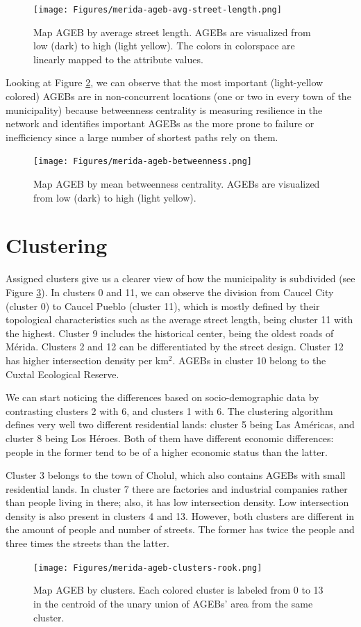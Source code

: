 \begin{figure}[h!]
	\centering
	\texttt{[image: Figures/merida-ageb-avg-street-length.png]}
	\caption{Map AGEB by average street length. AGEBs are visualized from low (dark) to high (light yellow). The colors in colorspace are linearly mapped to the attribute values.
		\label{fig:merida-ageb-avg-street-length}}
\end{figure}

Looking at Figure \ref{fig:merida-ageb-betweenness}, we can observe that the most important (light-yellow colored) AGEBs are in non-concurrent locations (one or two in every town of the municipality) because betweenness centrality is measuring resilience in the network and identifies important AGEBs as the more prone to failure or inefficiency since a large number of shortest paths rely on them. 

\begin{figure}[h!]
	\centering
	\texttt{[image: Figures/merida-ageb-betweenness.png]}
	\caption{Map AGEB by mean betweenness centrality. AGEBs are visualized from low (dark) to high (light yellow).
		\label{fig:merida-ageb-betweenness}}
\end{figure}

\section{Clustering}

Assigned clusters give us a clearer view of how the municipality is subdivided (see Figure \ref{fig:merida-ageb-clusters}). In clusters 0 and 11, we can observe the division from Caucel City (cluster 0) to Caucel Pueblo (cluster 11), which is mostly defined by their topological characteristics such as the average street length, being cluster 11 with the highest. Cluster 9 includes the historical center, being the oldest roads of Mérida. Clusters 2 and 12 can be differentiated by the street design. Cluster 12 has higher intersection density per km$^2$. AGEBs in cluster 10 belong to the Cuxtal Ecological Reserve.

We can start noticing the differences based on socio-demographic data by contrasting clusters 2 with 6, and clusters 1 with 6. The clustering algorithm defines very well two different residential lands: cluster 5 being Las Américas, and cluster 8 being Los Héroes. Both of them have different economic differences: people in the former tend to be of a higher economic status than the latter.

Cluster 3 belongs to the town of Cholul, which also contains AGEBs with small residential lands. In cluster 7 there are factories and industrial companies rather than people living in there; also, it has low intersection density. Low intersection density is also present in clusters 4 and 13. However, both clusters are different in the amount of people and number of streets. The former has twice the people and three times the streets than the latter.

\begin{figure}[h!]
	\centering
	\texttt{[image: Figures/merida-ageb-clusters-rook.png]}
	\caption{Map AGEB by clusters. Each colored cluster is labeled from 0 to 13 in the centroid of the unary union of AGEBs' area from the same cluster.
		\label{fig:merida-ageb-clusters}}
\end{figure}

